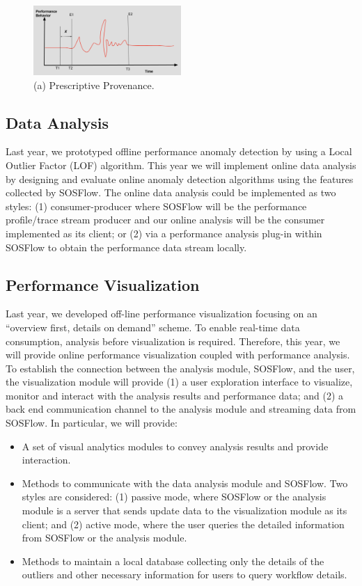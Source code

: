 \begin{figure}[th!]
 \centering
  \includegraphics[width=0.5\textwidth]{Figs/Provenance}
 \caption{(a) Prescriptive Provenance.}
\label{designfig:2}     
 \end{figure}

\subsection{Data Analysis}
Last year, we prototyped offline performance anomaly detection by using a Local Outlier Factor (LOF) algorithm. This year we will implement online data analysis by designing and evaluate online anomaly detection algorithms using the features collected by SOSFlow.  The online data analysis could be implemented as two styles: (1) consumer-producer where SOSFlow will be the performance profile/trace stream producer and our online analysis will be the consumer implemented as its client; or (2) via a performance analysis plug-in within SOSFlow to obtain the performance data stream locally.

\subsection{Performance Visualization}
Last year, we developed off-line performance visualization focusing on an ``overview first, details on demand'' scheme. To enable real-time data consumption, analysis before visualization is required.  Therefore, this year, we will provide online performance visualization coupled with performance analysis.  
To establish the connection between the analysis module, SOSFlow, and the user, the visualization module will provide (1) a user exploration interface to visualize, monitor and interact with the analysis results and performance data; and (2) a back end communication channel to the analysis module and streaming data from SOSFlow.   In particular,
we will provide:
\begin{itemize}
\item A set of visual analytics modules to convey analysis results and provide interaction.
\item Methods to communicate with the data analysis module and SOSFlow. Two styles are considered: (1) passive mode, where SOSFlow or the analysis module is a server that sends update data to the visualization module as its client; and (2) active mode, where the user queries the detailed information from SOSFlow or the analysis module. 
\item Methods to maintain a local database collecting only the details of the outliers and other necessary information for users to query workflow details.
\end{itemize}


